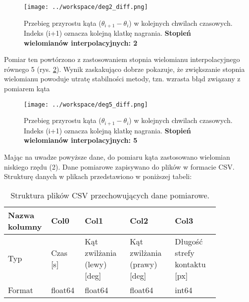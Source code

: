 \documentclass[a4paper,11pt,twoside,openright]{article} %
\begin{document}
\captionsetup{skip=0pt}
\begin{figure}[!h]
\captionsetup{justification=centering}
\begin{center}
\texttt{[image: ../workspace/deg2\_diff.png]} 
\end{center}
\caption{Przebieg przyrostu kąta ($\theta_{i+1} - \theta_{i}$) w kolejnych chwilach czasowych. \\Indeks (i+1) oznacza kolejną klatkę nagrania.  \textbf{Stopień wielomianów interpolacyjnych: 2}}
\label{fig:deg2_diff}
\end{figure} 
\newpage

\noindent Pomiar ten powtórzono z zastosowaniem stopnia wielomianu interpolacyjnego równego 5 (rys. \ref{fig:deg5_diff}). Wynik zaskakująco dobrze pokazuje, że zwiększanie stopnia wielomianu powoduje utratę stabilności metody, tzn. wzrasta błąd związany z pomiarem kąta 
\captionsetup{skip=0pt}
\begin{figure}[!h]
\captionsetup{justification=centering}
\begin{center}
\texttt{[image: ../workspace/deg5\_diff.png]} 
\end{center}
\caption{Przebieg przyrostu kąta ($\theta_{i+1} - \theta_{i}$) w kolejnych chwilach czasowych. \\Indeks (i+1) oznacza kolejną klatkę nagrania.  \textbf{Stopień wielomianów interpolacyjnych: 5}}
\label{fig:deg5_diff}
\end{figure} 


\noindent Mając na uwadze powyższe dane, do pomiaru kąta zastosowano wielomian niskiego rzędu (2). Dane pomiarowe zapisywano do plików w formacie CSV. Strukturę danych w plikach przedstawiono w poniższej tabeli:

\captionsetup{skip=2pt}
\begin{table}[h!]
\captionsetup{justification=centering}
\caption{Struktura plików CSV przechowujących dane pomiarowe.}
\begin{tabular}{| p{0.10\linewidth}| p{0.15\linewidth} | p{0.20\linewidth} | p{0.20\linewidth} | p{0.20\linewidth} |}
\hline
Nazwa kolumny & Col0  & Col1  & Col2  & Col3  \\ \hline
Typ  & Czas [s]  & Kąt zwilżania (lewy) [deg]  & Kąt zwilżania (prawy) [deg]  & Długość strefy kontaktu [px] \\ \hline
Format & float64 & float64 & float64 & int64 \\ \hline
\end{tabular}
\end{table}
\end{document}

